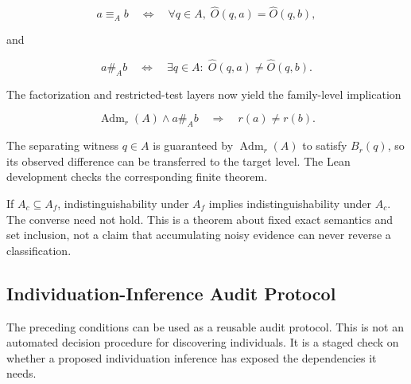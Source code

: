 \documentclass[12pt]{article}
\begin{document}
\[
a\equiv_A b
\quad\Longleftrightarrow\quad
\forall q\in A,\;
\widehat O(q,a)=\widehat O(q,b),
\]

and

\[
a\mathrel{\#_A}b
\quad\Longleftrightarrow\quad
\exists q\in A:\;
\widehat O(q,a)\neq\widehat O(q,b).
\]

The factorization and restricted-test layers now yield the family-level implication

\[
\operatorname{Adm}_r(A)
\land
a\mathrel{\#_A}b
\quad\Longrightarrow\quad
r(a)\neq r(b).
\]

The separating witness \(q\in A\) is guaranteed by \(\operatorname{Adm}_r(A)\) to satisfy \(B_r(q)\), so its observed difference can be transferred to the target level. The Lean development checks the corresponding finite theorem.

If \(A_c\subseteq A_f\), indistinguishability under \(A_f\) implies indistinguishability under \(A_c\). The converse need not hold. This is a theorem about fixed exact semantics and set inclusion, not a claim that accumulating noisy evidence can never reverse a classification.

\subsection{Individuation-Inference Audit Protocol}

The preceding conditions can be used as a reusable audit protocol. This is not an automated decision procedure for discovering individuals. It is a staged check on whether a proposed individuation inference has exposed the dependencies it needs.
\end{document}
